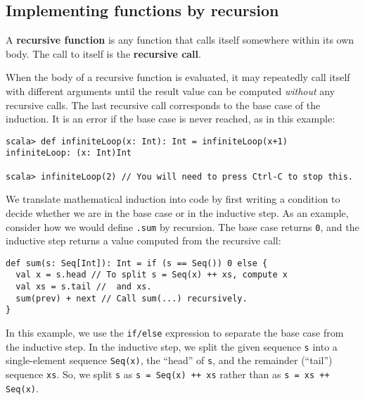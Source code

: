 \subsection{Implementing functions by recursion}

A \textbf{recursive function} is any function
that calls itself somewhere within its own body. The call to itself
is the \textbf{recursive call}.

When the body of a recursive function is evaluated, it may repeatedly
call itself with different arguments until the result value can be
computed \emph{without} any recursive calls. The last recursive call
corresponds to the base case of the induction. It is an error if the
base case is never reached, as in this example:
\begin{lstlisting}
scala> def infiniteLoop(x: Int): Int = infiniteLoop(x+1)
infiniteLoop: (x: Int)Int

scala> infiniteLoop(2) // You will need to press Ctrl-C to stop this.
\end{lstlisting}
We translate mathematical induction into code by first writing a condition
to decide whether we are in the base case or in the inductive step.
As an example, consider how we would define \lstinline!.sum!
by recursion. The base case returns \lstinline!0!,
and the inductive step returns a value computed from the recursive
call:
\begin{lstlisting}
def sum(s: Seq[Int]): Int = if (s == Seq()) 0 else {
  val x = s.head // To split s = Seq(x) ++ xs, compute x
  val xs = s.tail //  and xs.
  sum(prev) + next // Call sum(...) recursively.
}
\end{lstlisting}
In this example, we use the \lstinline!if/else!
expression to separate the base case from the inductive step. In the
inductive step, we split the given sequence \lstinline!s!
into a single-element sequence \lstinline!Seq(x)!,
the ``head'' of \lstinline!s!,
and the remainder (``tail'') sequence \lstinline!xs!.
So, we split \lstinline!s!
as \lstinline!s = Seq(x) ++ xs!
rather than as \lstinline!s = xs ++ Seq(x)!. 

